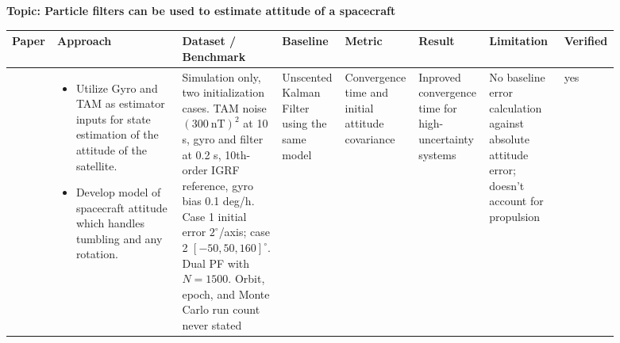 \textbf{Topic: Particle filters can be used to estimate attitude of a spacecraft} 

{\footnotesize\setlength{\tabcolsep}{3pt}
\begin{longtable}{@{}p{0.06\linewidth}p{0.20\linewidth}p{0.16\linewidth}p{0.10\linewidth}p{0.09\linewidth}p{0.11\linewidth}p{0.12\linewidth}p{0.05\linewidth}@{}}
  \toprule
    Paper & Approach & Dataset / Benchmark & Baseline & Metric & Result & Limitation & Verified \\
  \midrule
  \endhead
    \cite{xue-yuanjiangSpacecraftAttitudeEstimation2005} & 
    \begin{minipage}[t]{\linewidth}
    \begin{itemize}[nosep, left-margin=1em]
        \item Utilize Gyro and TAM as estimator inputs for state estimation of the attitude of the satellite.
        \item Develop model of spacecraft attitude which handles tumbling and any rotation.\strut
    \end{itemize}
    \end{minipage} &
    Simulation only, two initialization cases. TAM noise $(300\ \mathrm{nT})^2$ at 10 s, gyro and filter at 0.2 s, 10th-order IGRF reference, gyro bias 0.1 deg/h. Case 1 initial error $2^\circ$/axis; case 2 $[-50, 50, 160]^\circ$. Dual PF with $N = 1500$. Orbit, epoch, and Monte Carlo run count never stated &
    Unscented Kalman Filter using the same model & 
    Convergence time and initial attitude covariance &
    Inproved convergence time for high-uncertainty systems &
    No baseline error calculation against absolute attitude error; doesn't account for propulsion & yes \\
  \bottomrule
\end{longtable}}

